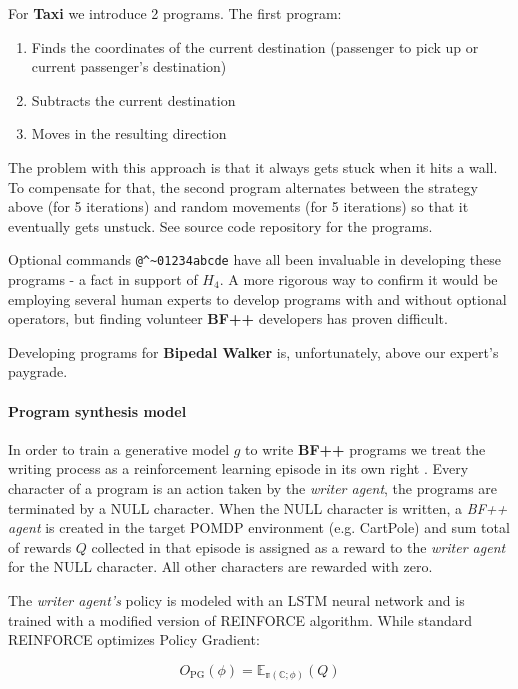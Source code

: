 For \textbf{Taxi} we introduce 2 programs.
The first program:
\begin{enumerate}
    \item Finds the coordinates of the current destination (passenger to pick up or current passenger's destination)
    \item Subtracts the current destination 
    \item Moves in the resulting direction
\end{enumerate}

The problem with this approach is that it always gets stuck when it hits a wall.
To compensate for that, the second program alternates between the strategy above (for 5 iterations) and random movements (for 5 iterations) so that it eventually gets unstuck. See source code repository for the programs.

Optional commands \verb|@^~01234abcde| have all been invaluable in developing these programs - a fact in support of $H_4$.
A more rigorous way to confirm it would be employing several human experts to develop programs with and without optional operators, but finding volunteer \textbf{BF++} developers has proven difficult. 

Developing programs for \textbf{Bipedal Walker} is, unfortunately, above our expert's paygrade. 

\paragraph{Program synthesis model}

In order to train a generative model $g$ to write \textbf{BF++} programs we treat the writing process as a reinforcement learning episode in its own right \cite{brain-coder} .
Every character of a program is an action taken by the \emph{writer agent}, the programs are terminated by a NULL character.
When the NULL character is written, a \emph{BF++ agent} is created in the target POMDP environment (e.g. CartPole) and sum total of rewards $Q$ collected in that episode is assigned as a reward to the \emph{writer agent} for the NULL character.
All other characters are rewarded with zero.

The \emph{writer agent's} policy is modeled with an LSTM \cite{hochreiterLongShorttermMemory1997} neural network and is trained with a modified version of REINFORCE \cite{reinforce} algorithm.
While standard REINFORCE optimizes Policy Gradient:

\begin{equation}
    O_{\text{PG}}(\phi) = \mathbb{E_{\pi(C; \phi)}}(Q)
\end{equation}

